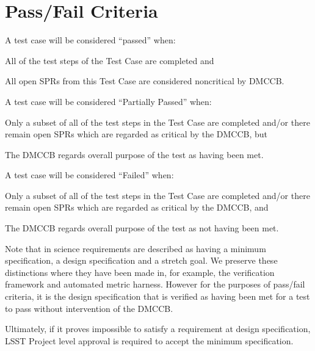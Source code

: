\section{Pass/Fail Criteria}

A test case will be considered ``passed'' when:
\begin{itemize_single}
\item All of the test steps of the Test Case are completed and
\item All open SPRs from this Test Case are considered noncritical by DMCCB.
\end{itemize_single}

A test case will be considered ``Partially Passed'' when:
\begin{itemize_single}
\item Only a subset of all of the test steps in the Test Case are completed and/or there remain open SPRs which are regarded as critical by the DMCCB, but
\item The DMCCB regards overall purpose of the test as having been met.
\end{itemize_single}

A test case will be considered ``Failed'' when:
\begin{itemize_single}
\item Only a subset of all of the test steps in the Test Case are completed and/or there remain open SPRs which are regarded as critical by the DMCCB, and
\item The DMCCB regards overall purpose of the test as not having been met.
\end{itemize_single}

Note that in  science requirements are described as having a minimum specification, a design specification and a stretch goal.
We preserve these distinctions where they have been made in, for example, the verification framework and automated metric harness.
However for the purposes of pass/fail criteria, it is the design specification that is verified as having been met for a test to pass without intervention of the DMCCB.

Ultimately, if it proves impossible to satisfy a requirement at design specification, LSST Project level approval is required to accept the minimum specification.
